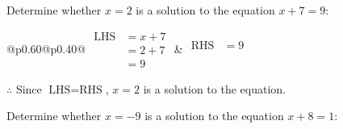 \documentclass[12pt]{article}
\newcounter{minipagecount}
\begin{document}
\begin{multicols}{2}
\begin{minipage}[t]{0.40\textwidth}
    \noindent Determine whether \(x = 2\) is a solution to the equation \(x + 7 = 9\):
    \vspace{4pt}  %

    \noindent
    \renewcommand{\arraystretch}{1.3} %
    \begin{tabular}{@{}p{0.60\linewidth}@{}p{0.40\linewidth}@{}}
        \(\begin{aligned}
            \text{LHS} &= x + 7 \\
                    &= 2 + 7 \\
                    &= 9
        \end{aligned}\) &
        \(\begin{aligned}
            \text{RHS} &= 9\\
                    & \\
                    &
        \end{aligned}\)
    \end{tabular}
    \renewcommand{\arraystretch}{1.0} %
    \vspace{2pt}  %

    \noindent \(\therefore\) Since \(\text{LHS} = \text{RHS}\), \(x = 2\) is  a solution to the equation.

\end{minipage}

 \vspace*{16pt}
\noindent{(\theminipagecount)}\hspace{0.1mm} %
\begin{minipage}[t]{0.40\textwidth} %

    \noindent Determine whether \(x = -9\) is a solution to the equation \(x + 8 = 1\):
    \vspace{4pt}  %


\end{minipage}
\end{multicols}
\end{document}
